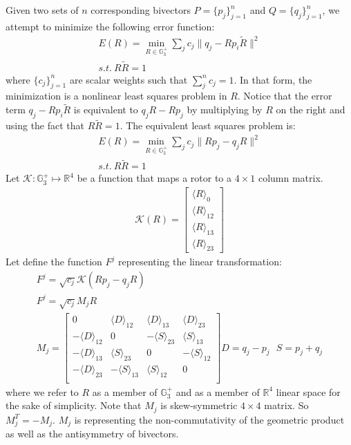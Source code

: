 \documentclass{birkjour}
\numberwithin{equation}{section}
\begin{document}
Given two sets of $n$ corresponding bivectors $P = \{p_j\}_{j=1}^n$ and $Q = \{q_j\}_{j=1}^n$, we attempt to minimize the following error function:
\begin{eqnarray*}
E(R) = \min_{R \in \mathbb{G}^{+}_3 } \sum_j { c_{j} \|q_j - R p_i \tilde R\|^2 }\\
s.t. \ R \tilde R = 1
\end{eqnarray*}
where $\{c_{j}\}_{j=1}^n$ are scalar weights such that $\sum_j^n{c_j} = 1$. In that form, the minimization is a nonlinear least squares problem in $R$. Notice that the error term $q_j - R p_i \tilde R$ is equivalent to $q_j R - R p_j$ by multiplying by $R$ on the right and using the fact that $R \tilde R = 1$. The equivalent least squares problem is:
\begin{eqnarray*}
E(R) = \min_{R \in \mathbb{G}^{+}_3 } \sum_j { c_{j} \|R p_j - q_j R\|^2 }\\
s.t. \ R \tilde R = 1
\end{eqnarray*}
Let $\mathcal K : \mathbb{G}^{+}_3 \mapsto \mathbb{R}^4$ be a function that maps a rotor to a $4\times1$ column matrix. 
\begin{eqnarray*}
\mathcal K(R) = \left[\begin{array}{c} \langle R \rangle_0 \\ \langle R \rangle_{12} \\ \langle R \rangle_{13} \\ \langle R \rangle_{23} \end{array}\right]
\end{eqnarray*}
Let define the function $F^j$ representing the linear transformation:
\begin{eqnarray*}
F^j = \sqrt{c_{j}} \mathcal K(R p_j - q_j R)\\
F^j = \sqrt{c_{j}} M_j R\\
M_j = 
\left[\begin{array}{cccc}
0                       & \langle D \rangle_{12} & \langle D \rangle_{13}  & \langle D \rangle_{23}\\ 
-\langle D \rangle_{12} &         0              & -\langle S \rangle_{23} & \langle S \rangle_{13}\\  
-\langle D \rangle_{13} & \langle S \rangle_{23} &          0              & -\langle S \rangle_{12}\\ 
-\langle D \rangle_{23} & -\langle S \rangle_{13}& \langle S \rangle_{12}  &          0             \\ 
\end{array}\right]
D = q_j - p_j \ \ \ S = p_j + q_j
\end{eqnarray*}
where we refer to $R$ as a member of $\mathbb{G}^{+}_3$ and as a member of $\mathbb R^4$ linear space for the sake of simplicity.
Note that $M_j$ is skew-symmetric $4\times4$ matrix. So $M_j^T = -M_j$. 
$M_j$ is representing the non-commutativity of the geometric product as well as the antisymmetry of bivectors.
\end{document}
